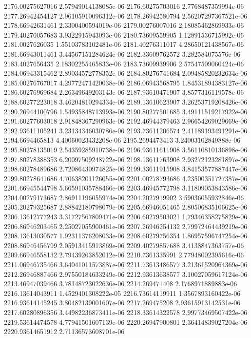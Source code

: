 {2176.00275627016 2.57949014138085e-06
2176.60275703016 2.7768487359994e-06
2177.26942454127 2.96105910096312e-06
2178.26942580794 2.56207297367521e-06
2178.66942631461 2.3300400594019e-06
2179.00276007016 2.18085462869933e-06
2179.40276057683 3.9322915943093e-06
2180.73609559905 1.12891536715992e-06
2181.0027626035 1.55103783102481e-06
2181.40276311017 4.28650121438567e-06
2181.66943011461 3.44567151284624e-06
2182.33609762572 3.282584075576e-06
2183.4027656435 2.18302255465833e-06
2183.73609939906 2.57547509060424e-06
2184.06943315462 2.89034572778352e-06
2184.80276741684 2.09485820232634e-06
2185.00276767017 4.29772471420038e-06
2186.06943568795 1.84531894383127e-06
2186.60276969684 2.26349649203143e-06
2187.93610471907 3.8577316119578e-06
2188.60277223018 3.46204810294334e-06
2189.13610623907 3.26253719208426e-06
2190.26944100796 1.54935848713993e-06
2190.80277501685 3.49111519217922e-06
2191.60277603018 2.91848367290963e-06
2192.46944379463 2.96654269029669e-06
2192.93611105241 3.23134346030786e-06
2193.73611206574 2.41189193491291e-06
2194.6694465813 4.40060023432208e-06
2195.2694473413 3.24003102849888e-06
2195.80278135019 2.54359285910738e-06
2196.93611611908 3.56110810136898e-06
2197.80278388353 6.20097509248722e-06
2198.13611763908 2.93272123281897e-06
2198.60278489686 2.72086430974825e-06
2199.33611915908 3.84153577887447e-06
2199.80278641686 4.70638201126055e-06
2201.00278793686 4.23500351727387e-06
2201.66945544798 5.66591035788466e-06
2203.46945772798 3.11809053843586e-06
2204.00279173687 2.86911196055974e-06
2204.2027919902 3.59036055932846e-06
2205.20279325687 2.88842180798079e-06
2205.66946051465 2.80506835106625e-06
2206.13612777243 3.31727567809471e-06
2206.60279503021 1.79346358275829e-06
2206.86946203465 2.25027055900461e-06
2207.26946254132 2.79972464439219e-06
2208.13613030577 1.92311376208033e-06
2208.60279756354 1.86957596747254e-06
2208.86946456799 2.05913415913869e-06
2209.40279857688 3.4138847363757e-06
2209.66946558132 2.79439263852012e-06
2210.7361335991 2.77948002395616e-06
2211.06946735466 3.64041011573887e-06
2211.73613486577 3.21361520964369e-06
2212.26946887466 2.97550184633249e-06
2212.93613638577 3.10027059617124e-06
2213.46947039466 3.78148723022636e-06
2214.269471408 2.1768971889883e-06
2216.13614043911 1.4529401308222e-05
2216.73614119911 1.3567893160422e-06
2216.93614145245 3.80482139001607e-06
2217.269475208 2.93615913142531e-06
2217.60280896356 3.44982236873411e-06
2218.33614322578 2.99773469507422e-06
2219.53614474578 4.77941501607139e-06
2220.26947900801 2.36414839027204e-06
2220.93614651912 2.71136573608701e-06
}
